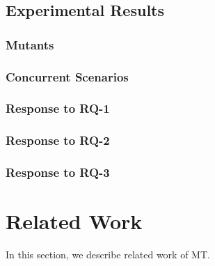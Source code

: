\documentclass[conference]{IEEEtran}
\theoremstyle{remark}
\begin{document}
\subsection{Experimental Results}

\subsubsection{Mutants}
\subsubsection{Concurrent Scenarios}
\subsubsection{Response to RQ-1}
\subsubsection{Response to RQ-2}
\subsubsection{Response to RQ-3}

\section{Related Work}
\label{section:related}
In this section, we describe related work of MT.
\end{document}
